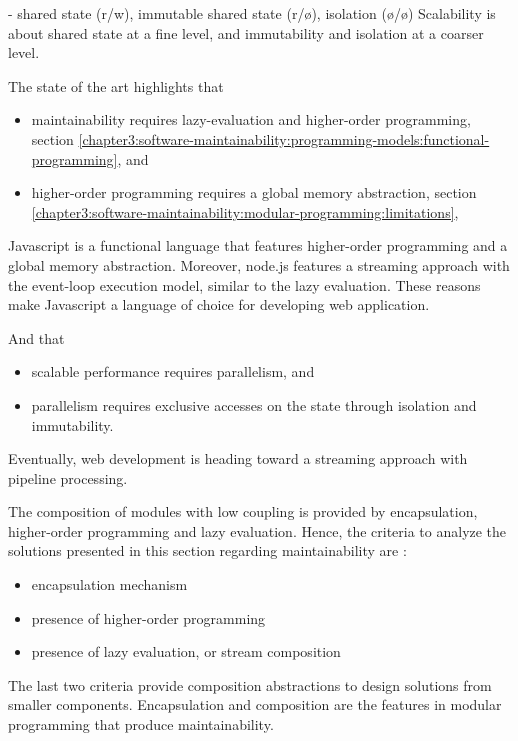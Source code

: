 - shared state (r/w), immutable shared state (r/ø), isolation (ø/ø)
Scalability is about shared state at a fine level, and immutability and isolation at a coarser level.


The state of the art highlights that
\begin{itemize}
\item maintainability requires lazy-evaluation and higher-order programming, section \ref{chapter3:software-maintainability:programming-models:functional-programming}, and
\item higher-order programming requires a global memory abstraction, section \ref{chapter3:software-maintainability:modular-programming:limitations},
\end{itemize}
Javascript is a functional language that features higher-order programming and a global memory abstraction.
Moreover, node.js features a streaming approach with the event-loop execution model, similar to the lazy evaluation.
These reasons make Javascript a language of choice for developing web application.

And that
\begin{itemize}
\item scalable performance requires parallelism, and
\item parallelism requires exclusive accesses on the state through isolation and immutability.
\end{itemize}
Eventually, web development is heading toward a streaming approach with pipeline processing.




The composition of modules with low coupling is provided by encapsulation, higher-order programming and lazy evaluation.
Hence, the criteria to analyze the solutions presented in this section regarding maintainability are :
\begin{itemize}
\item encapsulation mechanism
\item presence of higher-order programming
\item presence of lazy evaluation, or stream composition
\end{itemize}
The last two criteria provide composition abstractions to design solutions from smaller components.
Encapsulation and composition are the features in modular programming that produce maintainability.




